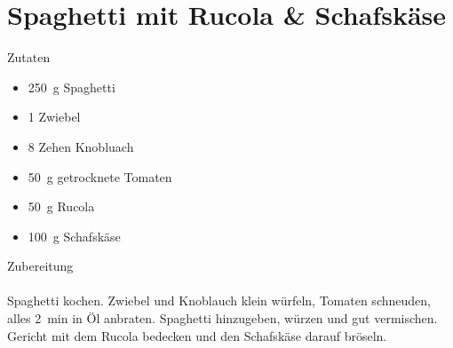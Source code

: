\section*{Spaghetti mit Rucola \& Schafskäse}
\ihead{}\ohead{}
\cfoot{}
{\Large Zutaten}
\begin{multicols}{2}
\begin{itemize}
    \item \SI{250}{g} Spaghetti
    \item \num{1} Zwiebel
    \item \num{8} Zehen Knobluach
    \item \SI{50}{g} getrocknete Tomaten
    \item \SI{50}{g} Rucola
    \item \SI{100}{g} Schafskäse
\end{itemize}
\end{multicols}
\noindent
{\Large Zubereitung}\\
\\
Spaghetti kochen.
Zwiebel und Knoblauch klein würfeln, Tomaten schneuden, alles \SI{2}{min} in Öl anbraten.
Spaghetti hinzugeben, würzen und gut vermischen.
Gericht mit dem Rucola bedecken und den Schafskäse darauf bröseln. 
